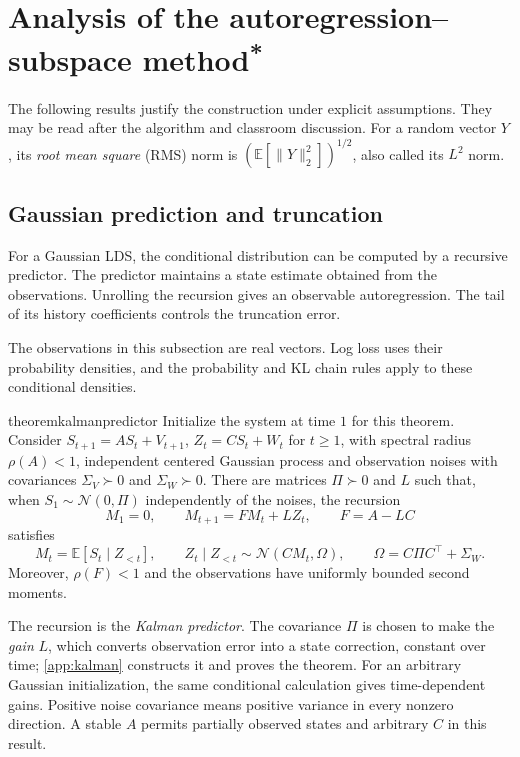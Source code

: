 \documentclass[11pt,twoside]{article}
\newcommand{\E}{\mathbb E}
\newcommand{\suppmark}{\texorpdfstring{\textsuperscript{*}}{*}}
\theoremstyle{definition}
\theoremstyle{remark}
\begin{document}
\section{Analysis of the autoregression--subspace method\suppmark}
\label{sec:optional-theory}
The following results justify the construction under explicit assumptions.
They may be read after the algorithm and classroom discussion.
For a random vector \(Y\), its \emph{root mean square} (RMS) norm is
\((\E[\|Y\|_2^2])^{1/2}\), also called its \(L^2\) norm.
\subsection{Gaussian prediction and truncation}
\label{sec:noisy-prediction}

For a Gaussian LDS, the conditional distribution can be computed by a
recursive predictor. The predictor maintains a state estimate obtained from
the observations. Unrolling the recursion gives an observable autoregression.
The tail of its history coefficients controls the truncation error.

The observations in this subsection are real vectors. Log loss uses their
probability densities, and the probability and KL chain rules apply to these
conditional densities.

\begin{restatable}{theorem}{kalmanpredictor}
\label{thm:kalman}
Initialize the system at time \(1\) for this theorem.
Consider \(S_{t+1}=AS_t+V_{t+1}\), \(Z_t=CS_t+W_t\) for
\(t\ge1\), with spectral radius
\(\rho(A)<1\), independent centered Gaussian process and observation
noises with covariances \(\Sigma_V\succ0\) and \(\Sigma_W\succ0\).
There are matrices \(\Pi\succ0\) and \(L\) such that, when
\(S_1\sim\mathcal N(0,\Pi)\) independently of the noises, the recursion
\begin{equation}
 M_1=0,\qquad M_{t+1}=FM_t+LZ_t,\qquad F=A-LC
 \label{eq:kalman-predictor}
\end{equation}
satisfies
\begin{equation}
 M_t=\E[S_t\mid Z_{<t}],\qquad
 Z_t\mid Z_{<t}\sim\mathcal N(CM_t,\Omega),\qquad
 \Omega=C\Pi C^\top+\Sigma_W.
 \label{eq:kalman-conditional}
\end{equation}
Moreover, \(\rho(F)<1\) and the observations have uniformly bounded
second moments.
\end{restatable}

The recursion is the \emph{Kalman predictor}. The covariance \(\Pi\)
is chosen to make the \emph{gain} \(L\), which converts observation error
into a state correction, constant over time; \cref{app:kalman} constructs it
and proves the theorem. For an arbitrary Gaussian initialization,
the same conditional calculation gives time-dependent gains.
Positive noise covariance means positive variance in every nonzero
direction. A stable \(A\) permits partially observed states and arbitrary
\(C\) in this result.
\end{document}
